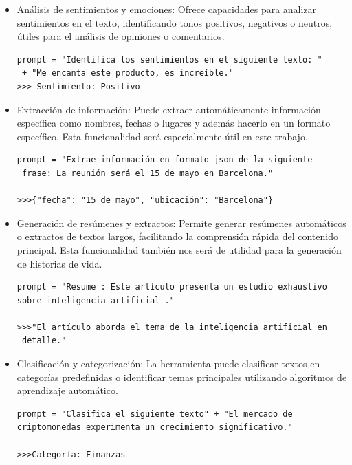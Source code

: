 \begin{itemize}

\item Análisis de sentimientos y emociones:
Ofrece capacidades para analizar sentimientos en el texto, identificando tonos positivos, negativos o neutros, útiles para el análisis de opiniones o comentarios.

\begin{verbatim}
prompt = "Identifica los sentimientos en el siguiente texto: "
 + "Me encanta este producto, es increíble."
>>> Sentimiento: Positivo
\end{verbatim}

\item Extracción de información:
Puede extraer automáticamente información específica como nombres, fechas o lugares y además hacerlo en un formato específico. Esta funcionalidad será especialmente útil en este trabajo.

\begin{verbatim}
prompt = "Extrae información en formato json de la siguiente
 frase: La reunión será el 15 de mayo en Barcelona."

>>>{"fecha": "15 de mayo", "ubicación": "Barcelona"}
\end{verbatim}

\item Generación de resúmenes y extractos:
Permite generar resúmenes automáticos o extractos de textos largos, facilitando la comprensión rápida del contenido principal. Esta funcionalidad también nos será de utilidad para la generación de historias de vida.

\begin{verbatim}
prompt = "Resume : Este artículo presenta un estudio exhaustivo 
sobre inteligencia artificial ."

>>>"El artículo aborda el tema de la inteligencia artificial en
 detalle."
\end{verbatim}

\item Clasificación y categorización:
La herramienta puede clasificar textos en categorías predefinidas o identificar temas principales utilizando algoritmos de aprendizaje automático.

\begin{verbatim}
prompt = "Clasifica el siguiente texto" + "El mercado de 
criptomonedas experimenta un crecimiento significativo."

>>>Categoría: Finanzas
\end{verbatim}

\end{itemize}
	
